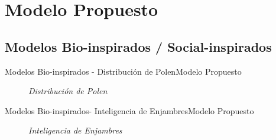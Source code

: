 \section{Modelo Propuesto}
\subsection{Modelos Bio-inspirados / Social-inspirados}
\begin{frame}{Modelos Bio-inspirados - Distribución de Polen}{Modelo Propuesto}
    \begin{figure}				
		\caption{\small \sl Distribución de Polen \cite{pollen}}
		\label{figure:Pollen}
    \end{figure}
\end{frame}
\begin{frame}{Modelos Bio-inspirados- Inteligencia de Enjambres}{Modelo Propuesto}
    \begin{figure}				
		\caption{\small \sl Inteligencia de Enjambres\cite{chanPSO}}
		\label{figure:Swarm}
    \end{figure}
\end{frame}
